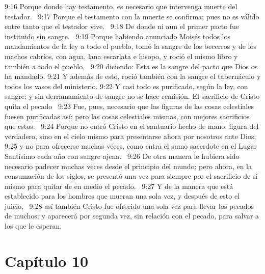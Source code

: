 9:16 Porque donde hay testamento, es necesario que intervenga muerte del testador.  
9:17 Porque el testamento con la muerte se confirma; pues no es válido entre tanto que el testador vive.  
9:18 De donde ni aun el primer pacto fue instituido sin sangre.  
9:19 Porque habiendo anunciado Moisés todos los mandamientos de la ley a todo el pueblo, tomó la sangre de los becerros y de los machos cabríos, con agua, lana escarlata e hisopo, y roció el mismo libro y también a todo el pueblo,  
9:20 diciendo: Esta es la sangre del pacto que Dios os ha mandado. 
9:21 Y además de esto, roció también con la sangre el tabernáculo y todos los vasos del ministerio. 
9:22 Y casi todo es purificado, según la ley, con sangre; y sin derramamiento de sangre no se hace remisión. 
El sacrificio de Cristo quita el pecado  
9:23 Fue, pues, necesario que las figuras de las cosas celestiales fuesen purificadas así; pero las cosas celestiales mismas, con mejores sacrificios que estos.  
9:24 Porque no entró Cristo en el santuario hecho de mano, figura del verdadero, sino en el cielo mismo para presentarse ahora por nosotros ante Dios;  
9:25 y no para ofrecerse muchas veces, como entra el sumo sacerdote en el Lugar Santísimo cada año con sangre ajena.  
9:26 De otra manera le hubiera sido necesario padecer muchas veces desde el principio del mundo; pero ahora, en la consumación de los siglos, se presentó una vez para siempre por el sacrificio de sí mismo para quitar de en medio el pecado.  
9:27 Y de la manera que está establecido para los hombres que mueran una sola vez, y después de esto el juicio,  
9:28 así también Cristo fue ofrecido una sola vez para llevar los pecados de muchos; y aparecerá por segunda vez, sin relación con el pecado, para salvar a los que le esperan.  
\section*{Capítulo 10 }

